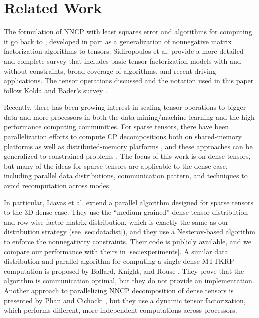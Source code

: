 
\section{Related Work} 
\label{sec:survey}

The formulation of NNCP with least squares error and algorithms for computing it go back to \cite{Paatero97,WW01}, developed in part as a generalization of nonnegative matrix factorization algorithms \cite{LS99} to tensors.
Sidiropoulos et al. \cite{SLFHPF2017} provide a more detailed and complete survey that includes basic tensor factorization models with and without constraints, broad coverage of algorithms, and recent driving applications.
The tensor operations discussed and the notation used in this paper follow Kolda and Bader's survey \cite{KB2009}. 

Recently, there has been growing interest in scaling tensor operations to bigger data and more processors in both the data mining/machine learning and the high performance computing communities. 
For sparse tensors, there have been parallelization efforts to compute CP decompositions both on shared-memory platforms \cite{SRSK2015,LCPSV17} as well as distributed-memory platforms \cite{KU16,SK16,KU18}, and these approaches can be generalized to constrained problems \cite{SBK2017}.
The focus of this work is on dense tensors, but many of the ideas for sparse tensors are applicable to the dense case, including parallel data distributions, communication pattern, and techniques to avoid recomputation across modes.

In particular, Liavas et al. \cite{LK+17b} extend a parallel algorithm designed for sparse tensors \cite{SK16} to the 3D dense case.
They use the ``medium-grained'' dense tensor distribution and row-wise factor matrix distribution, which is exactly the same as our distribution strategy (see \cref{sec:datadist}), and they use a Nesterov-based algorithm to enforce the nonnegativity constraints.
Their code is publicly available, and we compare our performance with theirs in \cref{sec:experiments}.
A similar data distribution and parallel algorithm for computing a single dense MTTKRP computation is proposed by Ballard, Knight, and Rouse \cite{BKR17-TR}. 
They prove that the algorithm is communication optimal, but they do not provide an implementation.
Another approach to parallelizing NNCP decomposition of dense tensors is presented by Phan and Cichocki \cite{PC11}, but they use a dynamic tensor factorization, which performs different, more independent computations across processors.

